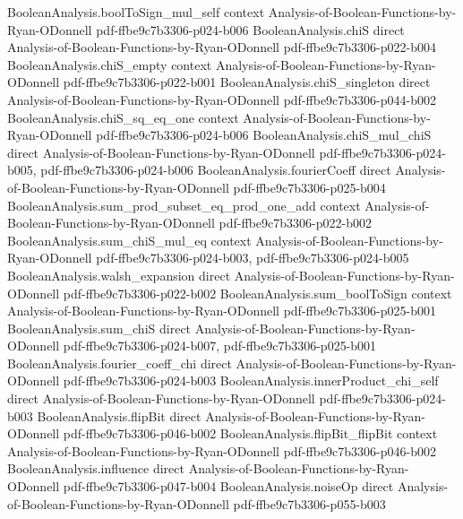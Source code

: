 \begin{theorem}
\proofstep
  {BooleanAnalysis.boolToSign_mul_self}
  {context}
  {Analysis-of-Boolean-Functions-by-Ryan-ODonnell}
  {pdf-ffbe9c7b3306-p024-b006}
\proofstep
  {BooleanAnalysis.chiS}
  {direct}
  {Analysis-of-Boolean-Functions-by-Ryan-ODonnell}
  {pdf-ffbe9c7b3306-p022-b004}
\proofstep
  {BooleanAnalysis.chiS_empty}
  {context}
  {Analysis-of-Boolean-Functions-by-Ryan-ODonnell}
  {pdf-ffbe9c7b3306-p022-b001}
\proofstep
  {BooleanAnalysis.chiS_singleton}
  {direct}
  {Analysis-of-Boolean-Functions-by-Ryan-ODonnell}
  {pdf-ffbe9c7b3306-p044-b002}
\proofstep
  {BooleanAnalysis.chiS_sq_eq_one}
  {context}
  {Analysis-of-Boolean-Functions-by-Ryan-ODonnell}
  {pdf-ffbe9c7b3306-p024-b006}
\proofstep
  {BooleanAnalysis.chiS_mul_chiS}
  {direct}
  {Analysis-of-Boolean-Functions-by-Ryan-ODonnell}
  {pdf-ffbe9c7b3306-p024-b005,
    pdf-ffbe9c7b3306-p024-b006}
\proofstep
  {BooleanAnalysis.fourierCoeff}
  {direct}
  {Analysis-of-Boolean-Functions-by-Ryan-ODonnell}
  {pdf-ffbe9c7b3306-p025-b004}
\proofstep
  {BooleanAnalysis.sum_prod_subset_eq_prod_one_add}
  {context}
  {Analysis-of-Boolean-Functions-by-Ryan-ODonnell}
  {pdf-ffbe9c7b3306-p022-b002}
\proofstep
  {BooleanAnalysis.sum_chiS_mul_eq}
  {context}
  {Analysis-of-Boolean-Functions-by-Ryan-ODonnell}
  {pdf-ffbe9c7b3306-p024-b003,
    pdf-ffbe9c7b3306-p024-b005}
\proofstep
  {BooleanAnalysis.walsh_expansion}
  {direct}
  {Analysis-of-Boolean-Functions-by-Ryan-ODonnell}
  {pdf-ffbe9c7b3306-p022-b002}
\proofstep
  {BooleanAnalysis.sum_boolToSign}
  {context}
  {Analysis-of-Boolean-Functions-by-Ryan-ODonnell}
  {pdf-ffbe9c7b3306-p025-b001}
\proofstep
  {BooleanAnalysis.sum_chiS}
  {direct}
  {Analysis-of-Boolean-Functions-by-Ryan-ODonnell}
  {pdf-ffbe9c7b3306-p024-b007,
    pdf-ffbe9c7b3306-p025-b001}
\proofstep
  {BooleanAnalysis.fourier_coeff_chi}
  {direct}
  {Analysis-of-Boolean-Functions-by-Ryan-ODonnell}
  {pdf-ffbe9c7b3306-p024-b003}
\proofstep
  {BooleanAnalysis.innerProduct_chi_self}
  {direct}
  {Analysis-of-Boolean-Functions-by-Ryan-ODonnell}
  {pdf-ffbe9c7b3306-p024-b003}
\proofstep
  {BooleanAnalysis.flipBit}
  {direct}
  {Analysis-of-Boolean-Functions-by-Ryan-ODonnell}
  {pdf-ffbe9c7b3306-p046-b002}
\proofstep
  {BooleanAnalysis.flipBit_flipBit}
  {context}
  {Analysis-of-Boolean-Functions-by-Ryan-ODonnell}
  {pdf-ffbe9c7b3306-p046-b002}
\proofstep
  {BooleanAnalysis.influence}
  {direct}
  {Analysis-of-Boolean-Functions-by-Ryan-ODonnell}
  {pdf-ffbe9c7b3306-p047-b004}
\proofstep
  {BooleanAnalysis.noiseOp}
  {direct}
  {Analysis-of-Boolean-Functions-by-Ryan-ODonnell}
  {pdf-ffbe9c7b3306-p055-b003}
\proofstep

\end{theorem}
